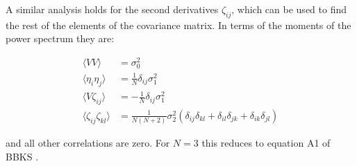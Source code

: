 \documentclass[12pt]{article}
\newcommand{\SH}[1]{\textcolor{brown}{[{\bf SH}: #1]}}
\begin{document}
A similar analysis holds for the second derivatives $\zeta_{ij}$, which can be used to find the rest of the elements of the covariance matrix. In terms of the moments of the power spectrum they are:


\begin{equation} \label{corr}
\begin{split}
\langle VV \rangle &= \sigma_0^2 \\
\langle\eta_i\eta_j\rangle &= \frac{1}{N}\delta_{ij}\sigma_1^2 \\
\langle V\zeta_{ij}\rangle &= -\frac{1}{N}\delta_{ij}\sigma_1^2 \\
\langle\zeta_{ij}\zeta_{kl}\rangle &= \frac{1}{N(N+2)}\sigma_2^2(\delta_{ij}\delta_{kl}+\delta_{il}\delta_{jk}+\delta_{ik}\delta_{jl})
\end{split}
\end{equation}

\noindent and all other correlations are zero. For $N=3$ this reduces to equation A1 of BBKS \cite{BBKS}. 



\end{document}
